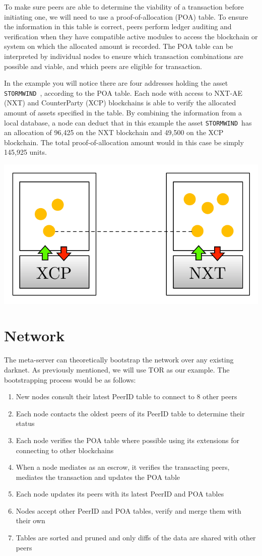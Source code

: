 \documentclass[11pt, a4paper]{article}
\newcommand{\stormwind}{\texttt{STORMWIND}\, }
\begin{document}
To make sure peers are able to determine the viability of a transaction before initiating one, we will need to use a proof-of-allocation (POA) table. To ensure the information in this table is correct, peers perform ledger auditing and verification when they have compatible active modules to access the blockchain or system on which the allocated amount is recorded. The POA table can be interpreted by individual nodes to ensure which transaction combinations are possible and viable, and which peers are eligible for transaction.

In the example you will notice there are four addresses holding the asset \stormwind, according to the POA table. Each node with access to NXT-AE (NXT) and CounterParty (XCP) blockchains is able to verify the allocated amount of assets specified in the table. By combining the information from a local database, a node can deduct that in this example the asset \stormwind has an allocation of 96,425 on the NXT blockchain and 49,500 on the XCP blockchain. The total proof-of-allocation amount would in this case be simply 145,925 units.

\includegraphics[width=.5\textwidth]{images/forumimg_valuetokens.pdf}

\section{Network}

The meta-server can theoretically bootstrap the network over any existing darknet. As previously mentioned, we will use TOR as our example. The bootstrapping process would be as follows:

\begin{enumerate}
\item New nodes consult their latest PeerID table to connect to 8 other peers
\item Each node contacts the oldest peers of its PeerID table to determine their status
\item Each node verifies the POA table where possible using its extensions
	    for connecting to other blockchains
\item When a node mediates as an escrow, it verifies the transacting peers,
	    mediates the transaction and updates the POA table
\item Each node updates its peers with its latest PeerID and POA tables
\item Nodes accept other PeerID and POA tables, verify and merge them with their own
\item Tables are sorted and pruned and only diffs of the data are shared with other peers
\end{enumerate}
\end{document}
